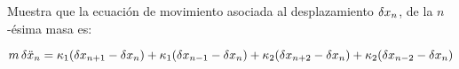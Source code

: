 \documentclass[./../main.tex]{subfiles}
\begin{document}
    \startsolution[print]

    \kant[1-2]

    \section{}

    Muestra que la ecuación de movimiento asociada al desplazamiento \(\fdif{x_{n}}\), de la \(n\)-ésima masa es:
    
    \begin{equation}
        m\fdif{\ddot{x}_{n}} = \kappa_{1}(\fdif{x_{n + 1}} - \fdif{x_{n}}) + \kappa_{1}(\fdif{x_{n - 1}} - \fdif{x_{n}}) + \kappa_{2}(\fdif{x_{n + 2}} - \fdif{x_{n}}) + \kappa_{2}(\fdif{x_{n - 2}} - \fdif{x_{n}})
    \end{equation}

    \startsolution[print]

            \kant[1-3]
\end{document}
